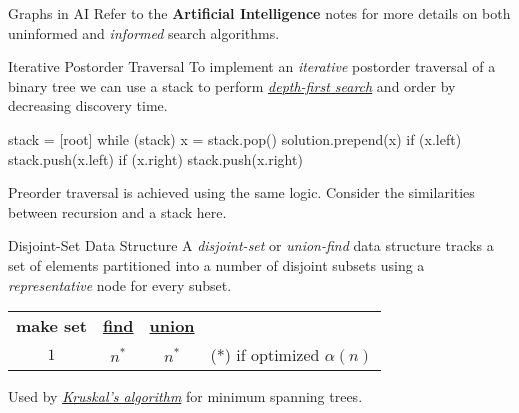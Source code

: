 \documentclass{cognito}
\begin{document}

\begin{note}{Graphs in AI}
	Refer to the \textbf{Artificial Intelligence} \noteref notes for more details on both uninformed and \emph{informed} search
	algorithms.
	
\end{note}

\begin{note}{Iterative Postorder Traversal}
	To implement an {\it iterative} postorder traversal of
	a binary tree we can use a stack to perform \hyperref[note:Depth-First Search]{\it depth-first search}
	and order by decreasing discovery time.
	\begin{largecode}
 stack = [root]
 while (stack)
 	x = stack.pop()
	solution.prepend(x)
	if (x.left) stack.push(x.left)
	if (x.right) stack.push(x.right)
	\end{largecode}
	\begin{remark} Preorder traversal is achieved using the same logic.
		Consider the similarities between recursion and a stack here.
	\end{remark}
	\vspace{-5pt}
\end{note}


\begin{note}{Disjoint-Set Data Structure}
	A {\it disjoint-set} or {\it union-find} data structure
	tracks a set of elements partitioned into a number of disjoint subsets using
	a {\it representative} node for every subset.
	\begin{mdframed}[linecolor=black!25!white]%
	\begin{tabular}{@{} c | c | c r @{}}
			{\bf make set} &
			\hyperref[note:Disjoint-Set Structure Find]{\bf find} &
			\hyperref[note:Disjoint-Set Structure Union]{\bf union}\\
		$1$ & $n^*$ & $n^*$ & \scriptsize \hspace{65pt} (*) if optimized $\alpha(n)$
	\end{tabular}%
	\end{mdframed}
	
	\begin{remark} Used by \hyperref[note:Kruskal's Algorithm]{\it Kruskal's algorithm} for minimum spanning trees. \end{remark}\vspace{-5pt}
\end{note}
\end{document}
